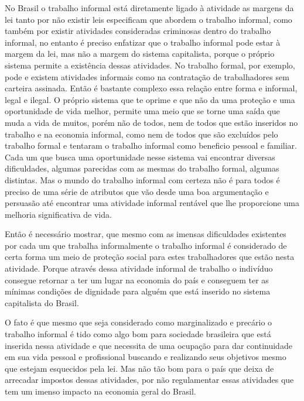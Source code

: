 No Brasil o trabalho informal está diretamente ligado à atividade as margens da lei tanto por não existir leis 
especificam que abordem o trabalho informal, como também por existir atividades consideradas criminosas dentro 
do trabalho informal, no entanto é preciso enfatizar que o trabalho informal pode estar à margem da lei, mas não 
a margem do sistema capitalista, porque o próprio sistema permite a existência dessas atividades. No trabalho 
formal, por exemplo, pode e existem atividades informais como na contratação de trabalhadores sem carteira assinada. 
Então é bastante complexo essa relação entre forma e informal, legal e ilegal. O próprio sistema que te oprime e
que não da uma proteção e uma oportunidade de vida melhor, permite uma meio que se torne uma saída que muda a vida
de muitos, porém não de todos, nem de todos que estão inseridos no trabalho e na economia informal, como nem de 
todos que são excluídos pelo trabalho formal e tentaram o trabalho informal como beneficio pessoal e familiar. 
Cada um que busca uma oportunidade nesse sistema vai encontrar diversas dificuldades, algumas parecidas com as
mesmas do trabalho formal, algumas distintas. Mas o mundo do trabalho informal com certeza não é para todos é 
preciso de uma série de atributos que vão desde uma boa argumentação e persuasão até encontrar uma atividade 
informal rentável que lhe proporcione uma melhoria significativa de vida.

Então é necessário mostrar, que mesmo com as imensas dificuldades existentes por cada um que trabalha informalmente
o trabalho informal é considerado de certa forma um meio de proteção social para estes trabalhadores que estão
nesta atividade. Porque através dessa atividade informal de trabalho o indivíduo consegue retornar a ter um lugar
na economia do país e conseguem ter as mínimas condições de dignidade para alguém que está inserido no sistema 
capitalista do Brasil.

O fato é que mesmo que seja considerado como marginalizado e precário o trabalho informal é tido como algo bom 
para sociedade brasileira que está inserida nessa atividade e que necessita de uma ocupação para dar continuidade
em sua vida pessoal e profissional buscando e realizando seus objetivos mesmo que estejam esquecidos pela lei.
Mas não tão bom para o país que deixa de arrecadar impostos dessas atividades, por não regulamentar essas 
atividades que tem um imenso impacto na economia geral do Brasil.

